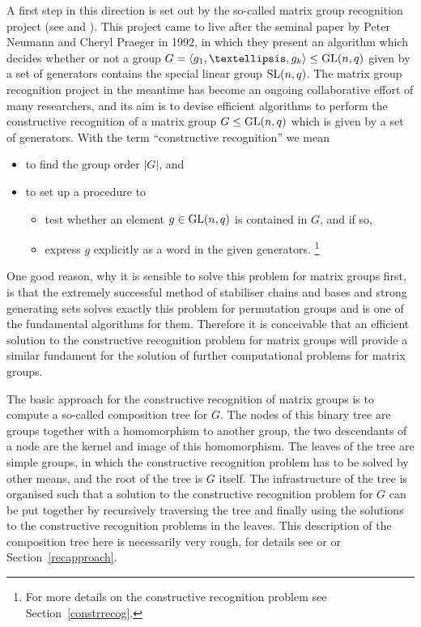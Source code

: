 A first step in this direction is set out by the so-called matrix group
recognition project (see \cite{MatGrpProj} and \cite{OB}). This project
came to live after the seminal paper \cite{neumann-praeger} by Peter Neumann 
and Cheryl Praeger in 1992, in which they present an algorithm which decides
whether or not a group $G = \left< g_1, \ldots, g_k\right> \le \GL(n,q)$
given by a set of generators contains the special linear group $\SL(n,q)$.
The matrix group recognition project in the meantime has become an ongoing 
collaborative effort of many researchers, and its aim
is to devise efficient algorithms to perform the constructive recognition
of a matrix group $G \le \GL(n,q)$ which is given by a set of generators. 
With the term ``constructive recognition'' we mean
\begin{itemize}
\setlength{\itemsep}{0pt}\setlength{\parskip}{0pt}
\item to find the group order $|G|$, and
\item to set up a procedure to 
\begin{itemize}
\setlength{\itemsep}{0pt}\setlength{\parskip}{0pt}
\item test whether an element $g \in \GL(n,q)$ is contained in $G$, and if so,
\item express $g$ explicitly as a word in the given generators.%
\footnote{For more details on the constructive recognition problem see
Section~\ref{constrrecog}.}
\end{itemize}
\end{itemize}
One good reason, why it is sensible to solve this problem for matrix groups
first, is that the extremely successful method of stabiliser chains and
bases and strong generating sets solves exactly
this problem for permutation groups and is one of the fundamental
algorithms for them. Therefore it is conceivable that an efficient solution
to the constructive recognition problem for matrix groups will provide a
similar fundament for the solution of further computational problems for
matrix groups.

The basic approach for the constructive recognition of matrix groups is
to compute a so-called composition tree for $G$. The nodes of this binary 
%
tree are groups together with a homomorphism to another group, the two
descendants of a node are the kernel and image of this homomorphism. The
leaves of the tree are simple groups, in which the constructive recognition
%
problem has to be solved by other means, and the root of the tree is $G$
itself. The infrastructure of the tree is organised such that a solution to
the constructive recognition problem for $G$ can be put together
by recursively traversing the tree and finally using the solutions to the
constructive recognition problems in the leaves. This description of the
composition tree here is
necessarily very rough, for details see \cite{MatGrpProj} or \cite{OB}
or Section~\ref{recapproach}.

